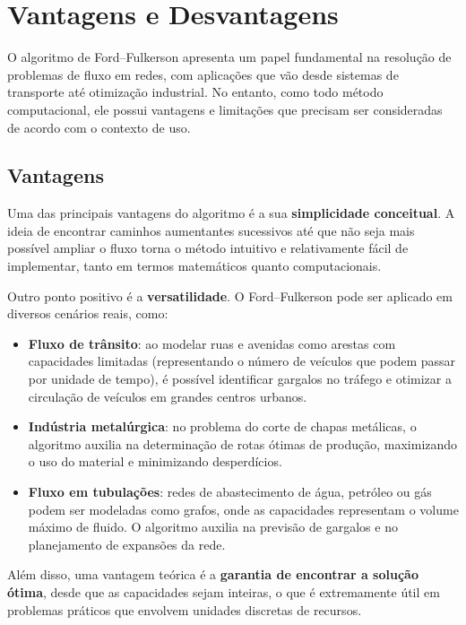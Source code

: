 \documentclass[12pt]{article}
\begin{document}
\section{Vantagens e Desvantagens} \label{sec:vantagens}

O algoritmo de Ford–Fulkerson apresenta um papel fundamental na resolução de problemas de fluxo em redes, com aplicações que vão desde sistemas de transporte até otimização industrial. No entanto, como todo método computacional, ele possui vantagens e limitações que precisam ser consideradas de acordo com o contexto de uso.

\subsection{Vantagens}

Uma das principais vantagens do algoritmo é a sua \textbf{simplicidade conceitual}. A ideia de encontrar caminhos aumentantes sucessivos até que não seja mais possível ampliar o fluxo torna o método intuitivo e relativamente fácil de implementar, tanto em termos matemáticos quanto computacionais.

Outro ponto positivo é a \textbf{versatilidade}. O Ford–Fulkerson pode ser aplicado em diversos cenários reais, como:


\begin{itemize} 
    \item \textbf{Fluxo de trânsito}: ao modelar ruas e avenidas como arestas com capacidades limitadas (representando o número de veículos que podem passar por unidade de tempo), é possível identificar gargalos no tráfego e otimizar a circulação de veículos em grandes centros urbanos.      
    \item \textbf{Indústria metalúrgica}: no problema do corte de chapas metálicas, o algoritmo auxilia na determinação de rotas ótimas de produção, maximizando o uso do material e minimizando desperdícios. 
    \item \textbf{Fluxo em tubulações}: redes de abastecimento de água, petróleo ou gás podem ser modeladas como grafos, onde as capacidades representam o volume máximo de fluido. O algoritmo auxilia na previsão de gargalos e no planejamento de expansões da rede. 
\end{itemize}

Além disso, uma vantagem teórica é a \textbf{garantia de encontrar a solução ótima}, desde que as capacidades sejam inteiras, o que é extremamente útil em problemas práticos que envolvem unidades discretas de recursos.
\end{document}
